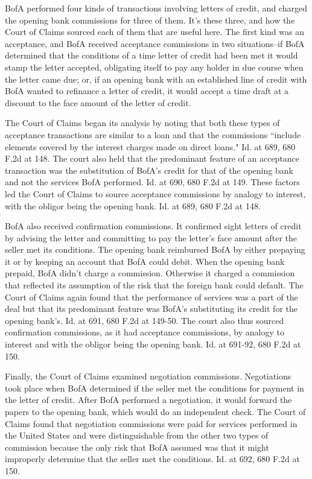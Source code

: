\begin{select}
BofA performed four kinds of transactions involving letters of credit, and charged the opening bank commissions for three of them. It's these three, and how the Court of Claims sourced each of them that are useful here. The first kind was an acceptance, and BofA received acceptance commissions in two situations--if BofA determined that the conditions of a time letter of credit had been met it would stamp the letter accepted, obligating itself to pay any holder in due course when the letter came due; or, if an opening bank with an established line of credit with BofA wanted to refinance a letter of credit, it would accept a time draft at a discount to the face amount of the letter of credit.

The Court of Claims began its analysis by noting that both these types of acceptance transactions are similar to a loan and that the commissions ``include elements covered by the interest charges made on direct loans." Id. at 689, 680 F.2d at 148. The court also held that the predominant feature of an acceptance transaction was the substitution of BofA's credit for that of the opening bank and not the services BofA performed. Id. at 690, 680 F.2d at 149. These factors led the  Court of Claims to source acceptance commissions by analogy to interest, with the obligor being the opening bank. Id. at 689, 680 F.2d at 148.

BofA also received confirmation commissions. It confirmed sight letters of credit by advising the letter and committing to pay the letter's face amount after the seller met its conditions. The opening bank reimbursed BofA by either prepaying it or by keeping an account that BofA could debit. When the opening bank prepaid, BofA didn't charge a commission. Otherwise it charged a commission that reflected its assumption of the risk that the foreign bank could default. The Court of Claims again found that the performance of services was a part of the deal but that its predominant feature was BofA's substituting its credit for the opening bank's. Id. at 691, 680 F.2d at 149-50. The court also thus sourced confirmation commissions, as it had acceptance commissions, by analogy to interest and with the obligor being the opening bank. Id. at 691-92, 680 F.2d at 150.

Finally, the Court of Claims examined negotiation commissions. Negotiations took place when BofA determined if the seller met the conditions for payment in the letter of credit. After BofA performed a negotiation, it would forward the papers to the opening  bank, which would do an independent check. The Court of Claims found that negotiation commissions were paid for services performed in the United States and were distinguishable from the other two types of commission because the only risk that BofA assumed was that it might improperly determine that the seller met the conditions. Id. at 692, 680 F.2d at 150.


\end{select}
